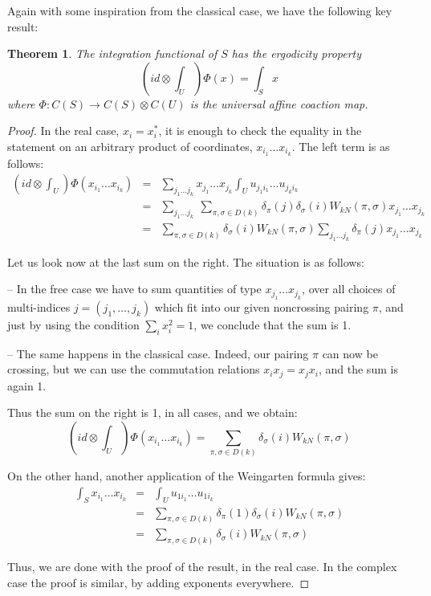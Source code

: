 \documentclass[12pt]{amsbook}
\newtheorem{theorem}{Theorem}[chapter]
\begin{document}
Again with some inspiration from the classical case, we have the following key result:

\begin{theorem}
The integration functional of $S$ has the ergodicity property
$$\left(id\otimes\int_U\right)\Phi(x)=\int_Sx$$
where $\Phi:C(S)\to C(S)\otimes C(U)$ is the universal affine coaction map.
\end{theorem}

\begin{proof}
In the real case, $x_i=x_i^*$, it is enough to check the equality in the statement on an arbitrary product of coordinates, $x_{i_1}\ldots x_{i_k}$. The left term is as follows:
\begin{eqnarray*}
\left(id\otimes\int_U\right)\Phi(x_{i_1}\ldots x_{i_k})
&=&\sum_{j_1\ldots j_k}x_{j_1}\ldots x_{j_k}\int_Uu_{j_1i_1}\ldots u_{j_ki_k}\\
&=&\sum_{j_1\ldots j_k}\ \sum_{\pi,\sigma\in D(k)}\delta_\pi(j)\delta_\sigma(i)W_{kN}(\pi,\sigma)x_{j_1}\ldots x_{j_k}\\
&=&\sum_{\pi,\sigma\in D(k)}\delta_\sigma(i)W_{kN}(\pi,\sigma)\sum_{j_1\ldots j_k}\delta_\pi(j)x_{j_1}\ldots x_{j_k}
\end{eqnarray*}

Let us look now at the last sum on the right. The situation is as follows:

\medskip

-- In the free case we have to sum quantities of type $x_{j_1}\ldots x_{j_k}$, over all choices of multi-indices $j=(j_1,\ldots,j_k)$ which fit into our given noncrossing pairing $\pi$, and just by using the condition $\sum_ix_i^2=1$, we conclude that the sum is 1. 

\medskip

-- The same happens in the classical case. Indeed, our pairing $\pi$ can now be crossing, but we can use the commutation relations $x_ix_j=x_jx_i$, and the sum is again 1.

\medskip

Thus the sum on the right is 1, in all cases, and we obtain:
$$\left(id\otimes\int_U\right)\Phi(x_{i_1}\ldots x_{i_k})
=\sum_{\pi,\sigma\in D(k)}\delta_\sigma(i)W_{kN}(\pi,\sigma)$$

On the other hand, another application of the Weingarten formula gives:
\begin{eqnarray*}
\int_Sx_{i_1}\ldots x_{i_k}
&=&\int_Uu_{1i_1}\ldots u_{1i_k}\\
&=&\sum_{\pi,\sigma\in D(k)}\delta_\pi(1)\delta_\sigma(i)W_{kN}(\pi,\sigma)\\
&=&\sum_{\pi,\sigma\in D(k)}\delta_\sigma(i)W_{kN}(\pi,\sigma)
\end{eqnarray*}

Thus, we are done with the proof of the result, in the real case. In the complex case the proof is similar, by adding exponents everywhere.
\end{proof} 
\end{document}

